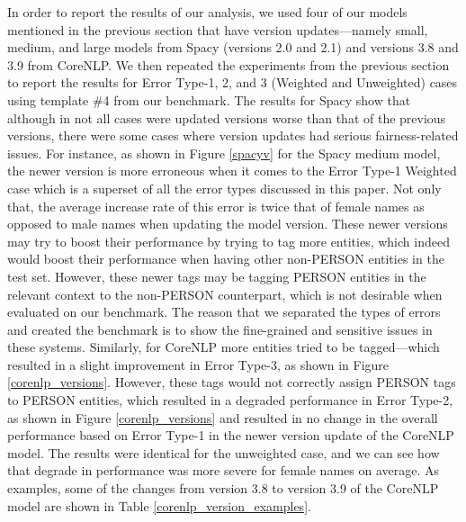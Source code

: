 In order to report the results of our analysis, we used four of our models mentioned in the previous section that have version updates---namely small, medium, and large models from Spacy (versions 2.0 and 2.1) and versions 3.8 and 3.9 from CoreNLP. We then repeated the experiments from the previous section to report the results for Error Type-1, 2, and 3 (Weighted and Unweighted) cases using template \#4 from our benchmark. The results for Spacy show that although in not all cases were updated versions worse than that of the previous versions, there were some cases where  version updates had serious fairness-related issues. For instance, as shown in Figure \ref{spacyv} for the Spacy medium model, the newer version is more erroneous when it comes to the Error Type-1 Weighted case which is a superset of all the error types discussed in this paper. Not only that, the average increase rate of this error is twice that of female names as opposed to male names when updating the model version. These newer versions may try to boost their performance by trying to tag more entities, which indeed would boost their performance when having other non-PERSON entities in the test set. However, these newer tags may be tagging PERSON entities in the relevant context to the non-PERSON counterpart, which is not desirable when evaluated on our benchmark. The reason that we separated the types of errors and created the benchmark is to show the fine-grained and sensitive issues in these systems. Similarly, for CoreNLP more entities tried to be tagged---which resulted in a slight improvement in Error Type-3, as shown in Figure \ref{corenlp_versions}. However, these tags would not correctly assign PERSON tags to PERSON entities, which resulted in a  degraded performance in Error Type-2, as shown in Figure \ref{corenlp_versions} and 
resulted in no change in the overall performance based on Error Type-1 in the newer version update of the CoreNLP model. The results were identical for the unweighted case, and we can see how that degrade in performance was more severe for female names on average. As examples, some of the changes from version 3.8 to version 3.9 of the CoreNLP model are shown in Table \ref{corenlp_version_examples}. 

